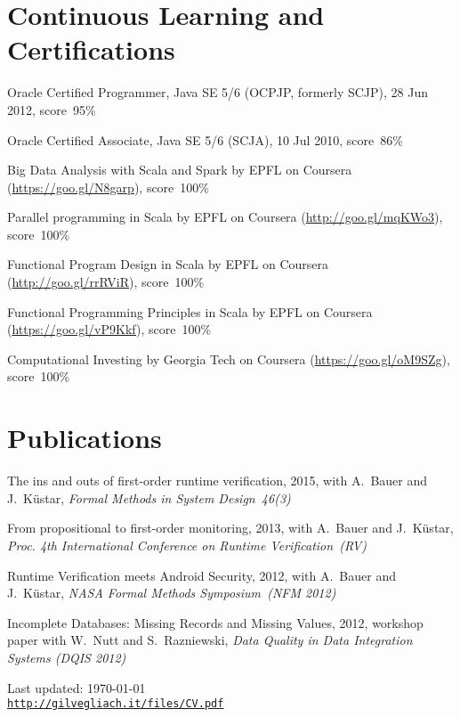 \documentclass[letterpaper]{article}
\def\footerlink{http://gilvegliach.it/files/CV.pdf}
\newenvironment{no-indent-itemize}{
  \begin{list}{}{
    \setlength{\leftmargin}{0em}
  }
}{
  \end{list}
}
\begin{document}
\section*{Continuous Learning and Certifications}
\begin{no-indent-itemize}
  \item Oracle Certified Programmer, Java SE 5/6 (OCPJP, formerly SCJP), 28 Jun 2012, score~95\%
  \item Oracle Certified Associate, Java SE 5/6 (SCJA), 10 Jul 2010, score~86\%
  \item Big Data Analysis with Scala and Spark by EPFL on Coursera 
        (\href{https://goo.gl/N8garp}{https://goo.gl/N8garp}), score~100\%
  \item Parallel programming in Scala by EPFL on Coursera 
        (\href{http://goo.gl/mqKWo3}{http://goo.gl/mqKWo3}), score~100\%
  \item Functional Program Design in Scala by EPFL on Coursera 
        (\href{https://goo.gl/vP9Kkf}{http://goo.gl/rrRViR}), score~100\%
  \item Functional Programming Principles in Scala by EPFL on Coursera 
        (\href{https://goo.gl/vP9Kkf}{https://goo.gl/vP9Kkf}), score~100\%
  \item Computational Investing by Georgia Tech on Coursera 
        (\href{https://goo.gl/oM9SZg}{https://goo.gl/oM9SZg}), score~100\%
\end{no-indent-itemize}

\section*{Publications}
\begin{no-indent-itemize}
  \item The ins and outs of first-order runtime verification, 2015, with A.~Bauer and J.~K\"{u}star, 
        {\it Formal Methods in System Design~46(3)}
  \item From propositional to first-order monitoring, 2013, with A.~Bauer and J.~K\"{u}star, 
        {\it Proc. 4th International Conference on Runtime Verification~(RV)}
  \item Runtime Verification meets Android Security, 2012, with A.~Bauer and J.~K\"{u}star, 
        {\it NASA Formal Methods Symposium~(NFM 2012)}
  \item Incomplete Databases: Missing Records and Missing Values, 2012, workshop paper with 
        W.~Nutt and S.~Razniewski, {\it Data Quality in Data Integration Systems (DQIS 2012)}
\end{no-indent-itemize}

\bigskip
\begin{center}
  \begin{footnotesize}
    Last updated: \today \\
    \href{\footerlink}{\texttt{\footerlink}}
  \end{footnotesize}
\end{center}
\end{document}
